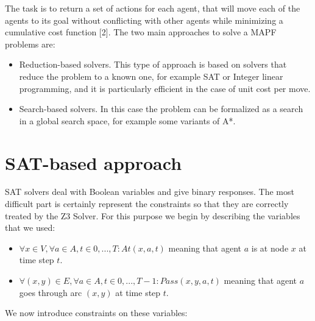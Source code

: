 \documentclass[12pt, a4paper, hidelinks]{article}
\numberwithin{equation}{section}
\begin{document}
The task is to return a set of actions for each agent, that will move each of the agents to its goal without conflicting with other agents while minimizing a cumulative cost function [2].
The two main approaches to solve a MAPF problems are:

\begin{itemize}
\item Reduction-based solvers.
This type of approach is based on solvers that reduce the problem to a known one, for example SAT or Integer linear programming, and it is particularly efficient in the case of unit cost per move.
\item Search-based solvers.
In this case the problem can be formalized as a search in a global search space, for example some variants of A*.
\end{itemize}

\section{SAT-based approach}\label{sec:sat-based-approach}
SAT solvers deal with Boolean variables and give binary responses.
The most difficult part is certainly represent the constraints so that they are correctly treated by the Z3 Solver.
For this purpose we begin by describing the variables that we used:

\begin{itemize}
\item $\forall x \in V, \forall a \in A, t \in {0, ..., T} : At(x, a, t)$ meaning that agent $a$ is at node $x$ at time step $t$.
\item $\forall(x, y)\in E, \forall a \in A, t \in {0, ..., T-1} : Pass(x, y, a, t)$ meaning that agent $a$ goes through arc $(x, y)$ at time step $t$. 
\end{itemize}

We now introduce constraints on these variables:
\end{document}
